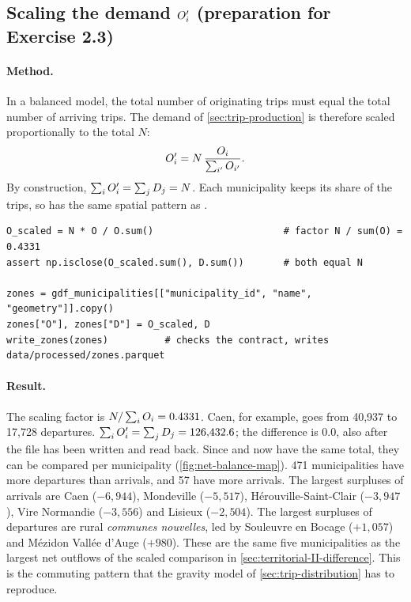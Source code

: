\subsection{Scaling the demand \texorpdfstring{$O'_i$}{O'} (preparation for Exercise 2.3)}

\paragraph{Method.}
In a balanced model, the total number of originating trips must equal the total number of arriving trips. The demand
of \cref{sec:trip-production} is therefore scaled proportionally to the total $N$:
\begin{equation}\label{eq:scaling}
  O'_i = N\, \frac{O_i}{\sum_{i'} O_{i'}} .
\end{equation}
By construction, $\sum_i O'_i = \sum_j D_j = N$. Each municipality keeps its share of the trips, so \Oprime{} has
the same spatial pattern as \Oi{}.
\begin{lstlisting}[style=py]
O_scaled = N * O / O.sum()                       # factor N / sum(O) = 0.4331
assert np.isclose(O_scaled.sum(), D.sum())       # both equal N

zones = gdf_municipalities[["municipality_id", "name", "geometry"]].copy()
zones["O"], zones["D"] = O_scaled, D
write_zones(zones)          # checks the contract, writes data/processed/zones.parquet
\end{lstlisting}

\paragraph{Result.}
The scaling factor is $N / \sum_i O_i = 0.4331$. Caen, for example, goes from 40{,}937 to 17{,}728 departures.
$\sum_i O'_i = \sum_j D_j = 126{,}432.6$; the difference is 0.0, also after the file has been written and read back.
Since \Oprime{} and \Dj{} now have the same total, they can be compared per municipality (\cref{fig:net-balance-map}).
471 municipalities have more departures than arrivals, and 57 have more arrivals. The largest surpluses of arrivals
are Caen ($-6{,}944$), Mondeville ($-5{,}517$), H\'erouville-Saint-Clair ($-3{,}947$), Vire Normandie ($-3{,}556$) and
Lisieux ($-2{,}504$). The largest surpluses of departures are rural \emph{communes nouvelles}, led by Souleuvre en
Bocage ($+1{,}057$) and M\'ezidon Vall\'ee d'Auge ($+980$). These are the same five municipalities as the largest net
outflows of the scaled comparison in \cref{sec:territorial-II-difference}. This is the commuting pattern that the
gravity model of \cref{sec:trip-distribution} has to reproduce.

